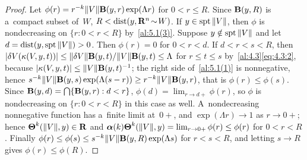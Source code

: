 \begin{proof}
    Let $\phi(r) = r^{-k} \|V\| \mathbf{B}(y,r) \exp(\Lambda r)$ for $0 < r \le R$. Since
    $\mathbf{B}(y,R)$ is a~compact subset of~$W$, $R < \operatorname{dist}(y, \mathbf{R}^{n} \!\sim\! W)$. If $y \in
    \operatorname{spt} \|V\|$, then $\phi$ is nondecreasing on $\{ r : 0 < r < R \}$ by~\ref{al:5.1(3)}. Suppose
    $y \notin \operatorname{spt} \|V\|$ and let $d = \operatorname{dist}(y, \operatorname{spt} \|V\|) > 0$. Then $\phi(r) = 0$ for $0 < r <
    d$. If $d < r < s < R$, then $|\delta V(\kappa(V,y,t))| \le \|\delta V\| \mathbf{B}(y,t) /
    \|V\| \mathbf{B}(y,t) \le \Lambda$ for $r \le t \le s$ by~\ref{al:4.3}\eqref{eq:4.3:2}, because
    $|\kappa(V,y,t)| \le \|V\| \mathbf{B}(y,t)^{-1}$; the right side of~\ref{al:5.1(1)} is
    nonnegative, hence $s^{-k} \|V\| \mathbf{B}(y,s) \exp(\Lambda (s - r)) \ge r^{-k} \|V\|
    \mathbf{B}(y,r)$, that is $\phi(r) \le \phi(s)$. Since $\mathbf{B}(y,d) = {{\textstyle \bigcap}} \{ \mathbf{B}(y,r) :
    d < r \}$, $\phi(d) = \lim_{r \to d+} \phi(r)$, so $\phi$ is nondecreasing on $\{ r : 0 < r <
    R \}$ in this case as well. A~nondecreasing nonnegative function has a~finite limit at~$0+$,
    and $\exp(\Lambda r) \to 1$ as $r \to 0+$; hence $\boldsymbol{\Theta}^{k}(\|V\|,y) \in \mathbf{R}$ and
    $\boldsymbol{\alpha}(k) \boldsymbol{\Theta}^{k}(\|V\|,y) = \lim_{r \to 0+} \phi(r) \le \phi(r)$ for $0
    < r < R$. Finally $\phi(r) \le \phi(s) \le s^{-k} \|V\| \mathbf{B}(y,R) \exp(\Lambda s)$ for
    $r < s < R$, and letting $s \to R$ gives $\phi(r) \le \phi(R)$.
\end{proof}

